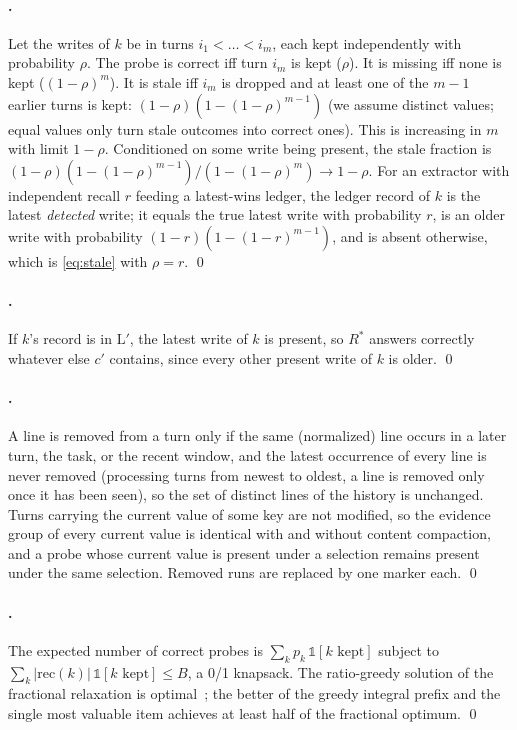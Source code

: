 \paragraph{.} Let the writes of $k$ be in turns
$i_1<\dots<i_m$, each kept independently with probability $\rho$. The probe is
correct iff turn $i_m$ is kept ($\rho$). It is missing iff none is kept
($(1-\rho)^m$). It is stale iff $i_m$ is dropped and at least one of the $m-1$
earlier turns is kept: $(1-\rho)(1-(1-\rho)^{m-1})$ (we assume distinct
values; equal values only turn stale outcomes into correct ones). This is
increasing in $m$ with limit $1-\rho$. Conditioned on some write being present,
the stale fraction is $(1-\rho)(1-(1-\rho)^{m-1})/(1-(1-\rho)^m)\to 1-\rho$.
For an extractor with independent recall $r$ feeding a latest-wins ledger, the
ledger record of $k$ is the latest \emph{detected} write; it equals the true
latest write with probability $r$, is an older write with probability
$(1-r)(1-(1-r)^{m-1})$, and is absent otherwise, which is \cref{eq:stale} with
$\rho=r$. \qed

\paragraph{.} If $k$'s record is in $\mathrm{L}'$, the latest
write of $k$ is present, so $R^\ast$ answers correctly whatever else $c'$
contains, since every other present write of $k$ is older. \qed

\paragraph{.} A line is removed from a turn only if the same
(normalized) line occurs in a later turn, the task, or the recent window, and the
latest occurrence of every line is never removed (processing turns from newest
to oldest, a line is removed only once it has been seen), so the set of distinct
lines of the history is unchanged. Turns carrying the current value of some key
are not modified, so the evidence group of every current value is identical with
and without content compaction, and a probe whose current value is present under
a selection remains present under the same selection. Removed runs are replaced
by one marker each. \qed

\paragraph{.} The expected number of correct probes is
$\sum_k p_k\,\mathbb{1}[k\text{ kept}]$ subject to $\sum_k |\mathrm{rec}(k)|\,
\mathbb{1}[k\text{ kept}]\le B$, a 0/1 knapsack. The ratio-greedy solution of
the fractional relaxation is optimal~\citep{dantzig1957knapsack}; the better of
the greedy integral prefix and the single most valuable item achieves at least
half of the fractional optimum. \qed

